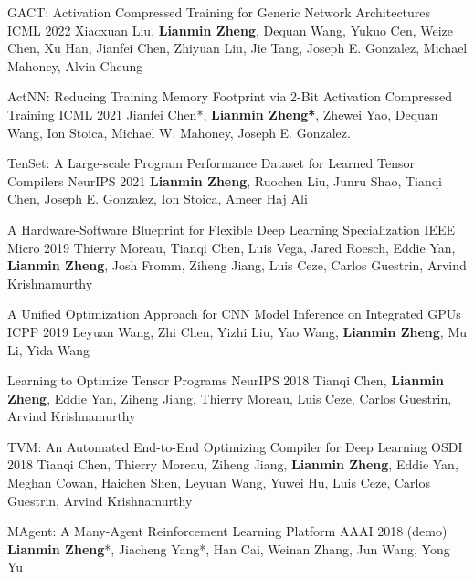 \begin{cventries}
	\cventry
	{}
	{GACT: Activation Compressed Training for Generic Network Architectures} %
	{ICML 2022} %
	{} %
	{Xiaoxuan Liu, \textbf{Lianmin Zheng}, Dequan Wang, Yukuo Cen, Weize Chen, Xu Han, Jianfei Chen, Zhiyuan Liu, Jie Tang, Joseph E. Gonzalez, Michael Mahoney, Alvin Cheung}
	
	\cventry
	{}
	{ActNN: Reducing Training Memory Footprint via 2-Bit Activation Compressed Training} %
	{ICML 2021} %
	{} %
	{Jianfei Chen*, \textbf{Lianmin Zheng*}, Zhewei Yao, Dequan Wang, Ion Stoica, Michael W. Mahoney, Joseph E. Gonzalez.}
	
	\cventry
	{}
	{TenSet: A Large-scale Program Performance Dataset for Learned Tensor Compilers} %
	{NeurIPS 2021} %
	{} %
	{\textbf{Lianmin Zheng}, Ruochen Liu, Junru Shao, Tianqi Chen, Joseph E. Gonzalez, Ion Stoica, Ameer Haj Ali}
	
	\cventry
	{}
	{A Hardware-Software Blueprint for Flexible Deep Learning Specialization} %
	{IEEE Micro 2019} %
	{} %
	{Thierry Moreau, Tianqi Chen, Luis Vega, Jared Roesch, Eddie Yan, \textbf{Lianmin Zheng}, Josh Fromm, Ziheng Jiang, Luis Ceze, Carlos Guestrin, Arvind Krishnamurthy}
	
	\cventry
	{}
	{A Unified Optimization Approach for CNN Model Inference on Integrated GPUs} %
	{ICPP 2019} %
	{} %
	{Leyuan Wang, Zhi Chen, Yizhi Liu, Yao Wang, \textbf{Lianmin Zheng}, Mu Li, Yida Wang}
	
	\cventry
	{}
	{Learning to Optimize Tensor Programs} %
	{NeurIPS 2018} %
	{} %
	{Tianqi Chen, \textbf{Lianmin Zheng}, Eddie Yan, Ziheng Jiang, Thierry Moreau, Luis Ceze, Carlos Guestrin, Arvind Krishnamurthy}
	
	\cventry
	{}
	{TVM: An Automated End-to-End Optimizing Compiler for Deep Learning} %
	{OSDI 2018} %
	{} %
	{Tianqi Chen, Thierry Moreau, Ziheng Jiang, \textbf{Lianmin Zheng}, Eddie Yan, Meghan Cowan, Haichen Shen, Leyuan Wang, Yuwei Hu, Luis Ceze, Carlos Guestrin, Arvind Krishnamurthy}
	
	\cventry
	{}
	{MAgent: A Many-Agent Reinforcement Learning Platform} %
	{AAAI 2018 (demo)} %
	{} %
	{\textbf{Lianmin Zheng}*, Jiacheng Yang*, Han Cai, Weinan Zhang, Jun Wang, Yong Yu}
	
\end{cventries}